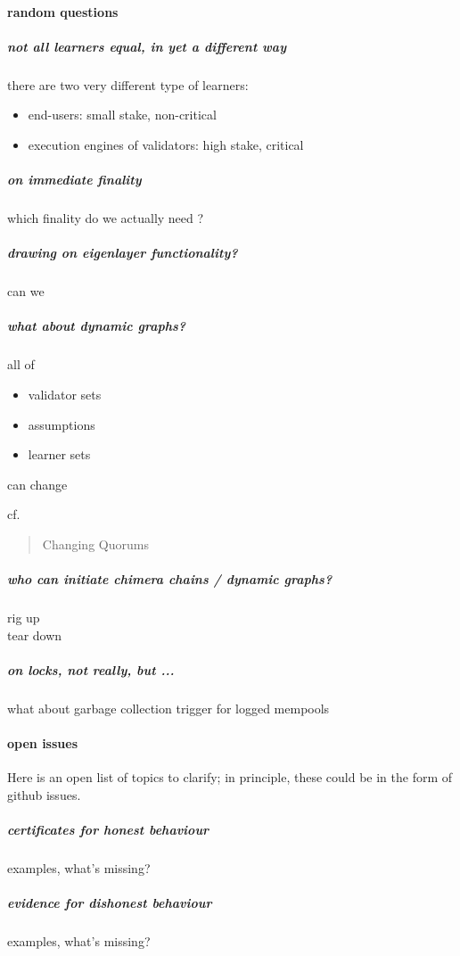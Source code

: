\documentclass{article}
\theoremstyle{definition}
\begin{document}
\paragraph{random questions}

\subparagraph{not all learners equal, in yet a different way}

there are two very different type of learners:
\begin{itemize}
\item end-users: small stake, non-critical
\item execution engines of validators: high stake, critical
\end{itemize}




\subparagraph{on immediate finality}
which finality do we actually need ?

\subparagraph{drawing on eigenlayer functionality?}
can we

\subparagraph{what about dynamic graphs?}
all of
\begin{itemize}
\item validator sets  
\item assumptions 
\item learner sets
\end{itemize}
can change

cf.
\begin{quote}
   Changing Quorums
\end{quote}

\subparagraph{who can initiate chimera chains / dynamic graphs?}
\begin{description}
\item[rig up] 
\item[tear down] 
\end{description}

\subparagraph{%
  on locks, not really, but ... 
}
what about garbage collection trigger 
for logged mempools




\paragraph{open issues}
Here is an open list of topics to clarify;
in principle, 
these could be in the form of github issues. 

\subparagraph{certificates for honest behaviour}
examples, what's missing?

\subparagraph{evidence for dishonest behaviour}
examples, what's missing?
\end{document}
